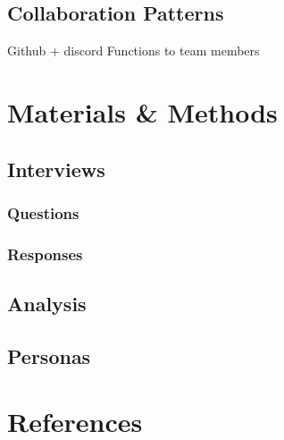 \documentclass[titlepage]{article}
\begin{document}
    \subsection{Collaboration Patterns}
        Github + discord \newline Functions to team members

\section{Materials \& Methods}
        \subsection{Interviews}
            \subsubsection{Questions}
                \blindtext[4]
        
            \subsubsection{Responses}
                \blindtext
    
        \subsection{Analysis}
            \blindtext
            
        \subsection{Personas}
            \blindtext

\section{References}


\end{document}
